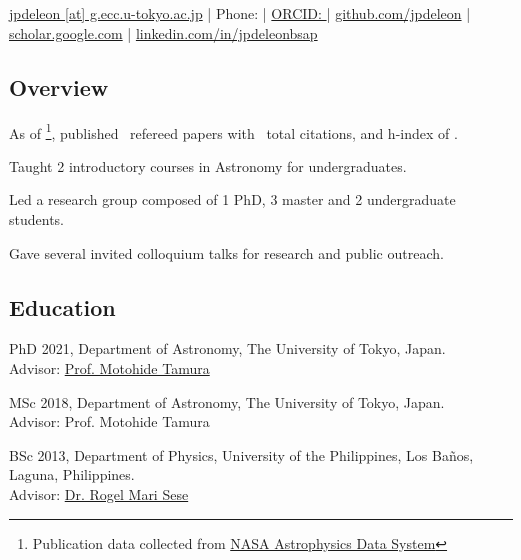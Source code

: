 \documentclass[12pt,letterpaper]{article}
\begin{document}
\thispagestyle{empty}\sloppy\sloppypar\raggedbottom

\textbf{\Large \fullname} \\[0.5ex]
\currentposition \\
\textsf{\small 
    \href{mailto:\email}{jpdeleon [at] g.ecc.u-tokyo.ac.jp} | %
    Phone: {\phonenumber} | %
    \href{\orcidurl}{ORCID: \orcid} | %
    \href{\githuburl}{github.com/jpdeleon} | %
    \href{\scholarurl}{scholar.google.com} | %
    \href{\linkedinurl}{linkedin.com/in/jpdeleonbsap}
}\\[0.5ex]

\subsection{Overview}
\begin{list}{}{\cvlist}
      \item As of \pubsdate\footnote{Publication data collected from \href{https://ui.adsabs.harvard.edu/}{NASA Astrophysics Data System}}, published \pubsnumber\ refereed papers with \pubscitations\ total citations, and h-index of \pubshindex.
      \item Taught 2 introductory courses in Astronomy for undergraduates. 
      \item Led a research group composed of 1 PhD, 3 master and 2 undergraduate students. 
      \item Gave several invited colloquium talks for research and public outreach.
\end{list}

\subsection{Education}
\begin{list}{}{\cvlist}
    \item
          PhD 2021, Department of Astronomy, The University of Tokyo, Japan.\\Advisor: \href{\tamuraurl}{Prof. Motohide Tamura}
    \item
          MSc 2018, Department of Astronomy, The University of Tokyo, Japan.\\Advisor: Prof. Motohide Tamura
    \item
          BSc 2013, Department of Physics, University of the Philippines, Los Ba\~nos, Laguna, Philippines.\\Advisor: \href{\seseurl}{Dr. Rogel Mari Sese}      
\end{list}
\end{document}
